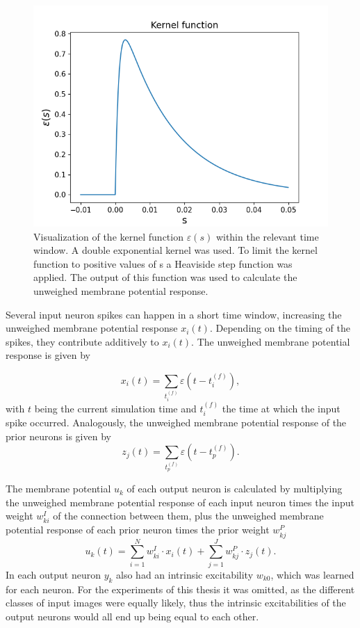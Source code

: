 \begin{figure}
  \centering
  \includegraphics[width=0.6\linewidth]{figures/kernelFunction.png}
  \caption{Visualization of the kernel function $\varepsilon (s)$ within the relevant time window. A double exponential kernel was used. To limit the kernel function to positive values of s a Heaviside step function was applied. The output of this function was used to calculate the unweighed membrane potential response. }
  \label{fig:kernelFunction}
\end{figure}

Several input neuron spikes can happen in a short time window, increasing the unweighed membrane potential response $x_i(t)$. Depending on the timing of the spikes, they contribute additively to $x_i(t)$. The unweighed membrane potential response is given by

\begin{equation}
x_i(t) = \sum_{t_i^{(f)}} \varepsilon (t - t_i^{(f)}),
\end{equation}
with $t$ being the current simulation time and $t_i^{(f)}$ the time at which the input spike occurred.
Analogously, the unweighed membrane potential response of the prior neurons is given by
\begin{equation}
z_j(t) = \sum_{t_p^{(f)}} \varepsilon (t - t_p^{(f)}).
\end{equation}
 
The membrane potential $u_k$ of each output neuron is calculated by multiplying the unweighed membrane potential response of each input neuron times the input weight $w^{I}_{ki}$ of the connection between them, plus the unweighed membrane potential response of each prior neuron times the prior weight $w^{P}_{kj}$
\begin{equation}
\label{eqn:uk}
u_k(t) = \sum_{i=1}^N w^{I}_{ki} \cdot x_i(t) + \sum_{j=1}^J w^{P}_{kj} \cdot z_j(t).
\end{equation}
In \citet{nessler} each output neuron $y_k$ also had an intrinsic excitability $w_{k0}$, which was learned for each neuron. For the experiments of this thesis it was omitted, as the different classes of  input images were equally likely, thus the intrinsic excitabilities of the output neurons would all end up being equal to each other.

